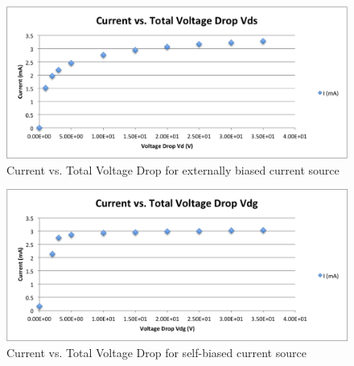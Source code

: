 \documentclass{article}
\begin{document}
    \begin{figure}[H]
        \centering
        \includegraphics[scale = 0.7]{4_10d.png}
        \caption{Current vs. Total Voltage Drop for externally biased current source}
        \label{fig:my_label}
    \end{figure}
    \begin{figure}[H]
        \centering
        \includegraphics[scale = 0.7]{4_11.png}
        \caption{Current vs. Total Voltage Drop for self-biased current source}
        \label{fig:my_label}
    \end{figure}
\end{document}
